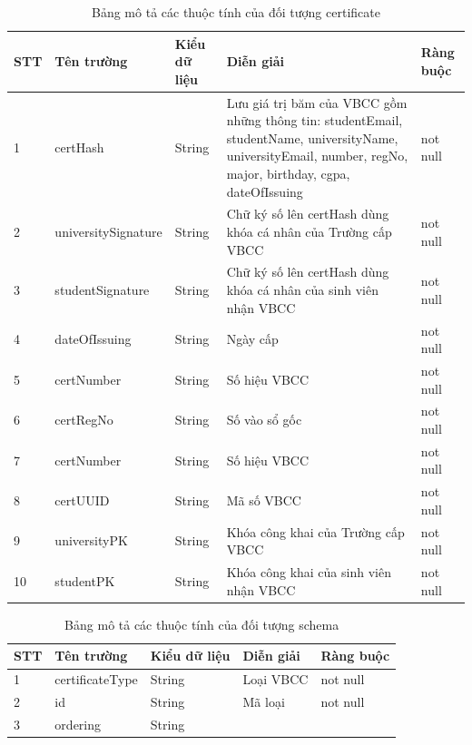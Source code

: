 \begin{table}[H]
\caption{Bảng mô tả các thuộc tính của đối tượng certificate}
	\label{table:assetcertificate}
	\begin{tabularx} {\textwidth} {|p{0.8cm}|p{3.5cm}|p{2.5cm}|X|p{2cm}|}
\hline
		STT &	Tên trường & Kiểu dữ liệu & Diễn giải & Ràng buộc \\ \hline
		1 & certHash	& String & Lưu giá trị băm của VBCC gồm những thông tin: studentEmail, studentName, universityName, universityEmail, number, regNo, major, birthday, cgpa, dateOfIssuing  & not null \\ \hline
		2 & universitySignature & String  & Chữ ký số lên certHash dùng khóa cá nhân của Trường cấp VBCC  & not null \\ \hline
		3 & studentSignature	&  String & Chữ ký số lên certHash dùng khóa cá nhân của sinh viên nhận VBCC  & not null\\ \hline
		4 & dateOfIssuing	& String & Ngày cấp  &not null \\ \hline
		5 & certNumber	& String & Số hiệu VBCC  & not null\\ \hline
		6 & certRegNo	& String & Số vào sổ gốc  & not null\\ \hline
		7 & certNumber	& String & Số hiệu VBCC  & not null\\ \hline
		8 & certUUID	& String & Mã số VBCC  & not null\\ \hline
		9 & universityPK	& String & Khóa công khai của Trường cấp VBCC  &not null \\ \hline
		10 & studentPK	& String & Khóa công khai của sinh viên nhận VBCC  &not null \\ \hline
\end{tabularx}
\end{table}


\begin{table}[H]
\caption{Bảng mô tả các thuộc tính của đối tượng schema}
	\label{table:assetschema}
	\begin{tabularx} {\textwidth} {|p{1cm}|p{3cm}|p{3cm}|X|p{2cm}|}
\hline
		STT &	Tên trường & Kiểu dữ liệu & Diễn giải & Ràng buộc \\ \hline
		1 & certificateType	& String & Loại VBCC  & not null \\ \hline
		2 & id  & String  & Mã loại  & not null \\ \hline
		3 & ordering	&  String &   & \\ \hline
	\end{tabularx}
\end{table}



